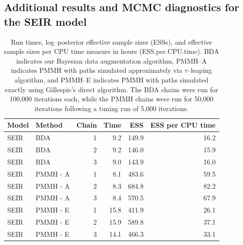 \subsection{Additional results and MCMC diagnostics for the SEIR model}

\begin{table}[htbp]
	\centering
	\begin{tabular}{llrrrr}
		\hline
		Model & Method & Chain & Time & ESS & ESS per CPU time \\ 
		\hline
		SEIR & BDA &  1 & 9.2 & 149.9 & 16.2 \\ 
		SEIR & BDA &  2 & 9.2 & 146.0 & 15.9 \\ 
		SEIR & BDA &  3 & 9.0 & 143.9 & 16.0 \\ 
		SEIR & PMMH - A &  1 & 8.1 & 483.6 & 59.5 \\ 
		SEIR & PMMH - A &  2 & 8.3 & 684.8 & 82.2 \\ 
		SEIR & PMMH - A &  3 & 8.4 & 570.5 & 67.9 \\ 
		SEIR & PMMH - E &  1 & 15.8 & 411.9 & 26.1 \\ 
		SEIR & PMMH - E &  2 & 15.9 & 589.8 & 37.1 \\ 
		SEIR & PMMH - E &  3 & 14.1 & 466.3 & 33.1 \\ 
		\hline
	\end{tabular}
	\caption[Simulation 1 SEIR model log--posterior effective sample sizes and run times.]{Run times, log--posterior effective sample sizes (ESSs), and effective sample sizes per CPU time measure in hours (ESS.per.CPU.time). BDA indicates our Bayesian data augmentation algorithm, PMMH--A indicates PMMH with paths simulated approximately via $ \tau $--leaping algorithm, and PMMH--E indicates PMMH with paths simulated exactly using Gillespie's direct algorithm. The BDA chains were run for 100,000 iterations each, while the PMMH chains were run for 50,000 iterations following a tuning run of 5,000 iterations.}
	\label{tab:sim1_seir_ess}
\end{table}

